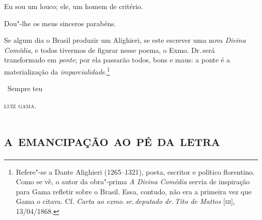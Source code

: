 Eu sou um louco; ele, um homem de critério.

Dou"-lhe os meus sinceros parabéns.

Se algum dia o Brasil produzir um Alighieri, se este escrever uma nova
\emph{Divina Comédia}, e todos tivermos de figurar nesse poema, o Exmo.
Dr.\,será transformado em \emph{ponte}; por ela passarão todos, bons e
maus: a ponte é a materialização da \emph{imparcialidade}.\footnote{
  Refere"-se a Dante Alighieri (1265--1321), poeta, escritor e político
  florentino. Como se vê, o autor da obra"-prima \emph{A Divina
  Comédia} servia de inspiração para Gama refletir sobre o Brasil.
  Essa, contudo, não era a primeira vez que Gama o citava. Cf.
  \emph{Carta ao exmo.\,sr.\,deputado dr.\,Tito de Mattos} {[}\textsc{iii}{]},
  13/04/1868.}

\bigskip

\hfill\ Sempre teu\smallskip

\hfill\textsc{luiz gama.}

\paginabranca
\begingroup\makeatletter\@openrightfalse
\part{\textsc{a emancipação ao pé da letra}}

\mbox{}\vfill
\thispagestyle{empty}


